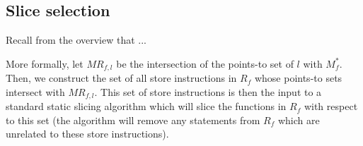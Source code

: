 



\subsection{Slice selection}\label{Se:Slicing}

Recall from the overview that ...

More formally, let $MR_{f,l}$ be the intersection of the points-to set
of $l$ with $M^{*}_f$.  Then, we construct the set of all store
instructions in $R_f$ whose points-to sets intersect with $MR_{f,l}$.
This set of store instructions is then the input to a standard
static slicing algorithm which will slice the functions in $R_f$ with
respect to this set (\ie the algorithm will remove any statements from
$R_f$ which are unrelated to these store instructions).









